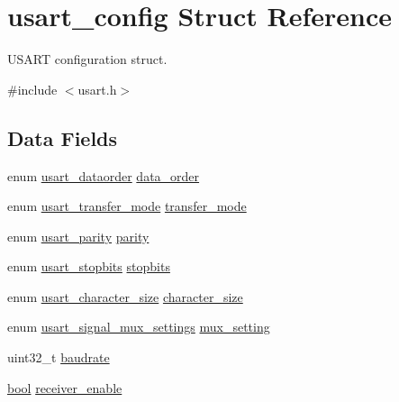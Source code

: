 \hypertarget{structusart__config}{}\section{usart\+\_\+config Struct Reference}
\label{structusart__config}


U\+S\+A\+RT configuration struct.  




{\ttfamily \#include $<$usart.\+h$>$}

\subsection*{Data Fields}
\begin{DoxyCompactItemize}
\item 
enum \mbox{\hyperlink{group__asfdoc__sam0__sercom__usart__group_ga4352d9150bb8cbd54d26abe3055a5ee1}{usart\+\_\+dataorder}} \mbox{\hyperlink{structusart__config_a4ec56a286aa79454eb9bf4190b85c086}{data\+\_\+order}}
\item 
enum \mbox{\hyperlink{group__asfdoc__sam0__sercom__usart__group_ga7ff4d85053b8ea0904b5a57587b39c8f}{usart\+\_\+transfer\+\_\+mode}} \mbox{\hyperlink{structusart__config_a6715fb00b24023ec771ff0f5bf0305d3}{transfer\+\_\+mode}}
\item 
enum \mbox{\hyperlink{group__asfdoc__sam0__sercom__usart__group_ga867cc5f0ea7d3bf651d68f0046cf6f41}{usart\+\_\+parity}} \mbox{\hyperlink{structusart__config_a4fe46d461602152192b62616aa456d03}{parity}}
\item 
enum \mbox{\hyperlink{group__asfdoc__sam0__sercom__usart__group_gab7d8ac715e2bd7ccddc65bf2c5ceb1f5}{usart\+\_\+stopbits}} \mbox{\hyperlink{structusart__config_a6613fcda1e5a9a287ee8902ba28de724}{stopbits}}
\item 
enum \mbox{\hyperlink{group__asfdoc__sam0__sercom__usart__group_ga631ce7b4f60dccd392e6d6ef7d3cd4e2}{usart\+\_\+character\+\_\+size}} \mbox{\hyperlink{structusart__config_a30702e47861220f8092295e86df57e3b}{character\+\_\+size}}
\item 
enum \mbox{\hyperlink{group__asfdoc__sam0__sercom__usart__group_ga87bbdb9f7edb3f1866aeb498bf7c9077}{usart\+\_\+signal\+\_\+mux\+\_\+settings}} \mbox{\hyperlink{structusart__config_aaa7bd399d02871be8e083486224d99c5}{mux\+\_\+setting}}
\item 
uint32\+\_\+t \mbox{\hyperlink{structusart__config_ac4f06ea26ed6bd7ae83b92d64ac10b78}{baudrate}}
\item 
\mbox{\hyperlink{group__group__sam0__utils_ga97a80ca1602ebf2303258971a2c938e2}{bool}} \mbox{\hyperlink{structusart__config_aeb0ee3a89acb7a67727a62a68adf0120}{receiver\+\_\+enable}}

\end{DoxyCompactItemize}
